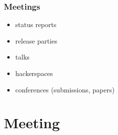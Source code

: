 \begin{frame}[<+-| alert@+>]
	\frametitle{Meetings}

	\begin{itemize}
		\item status reports
		\item release parties
		\item talks
		\item hackerspaces
		\item conferences (submissions, papers)
	\end{itemize}
\end{frame}



\section{Meeting}

